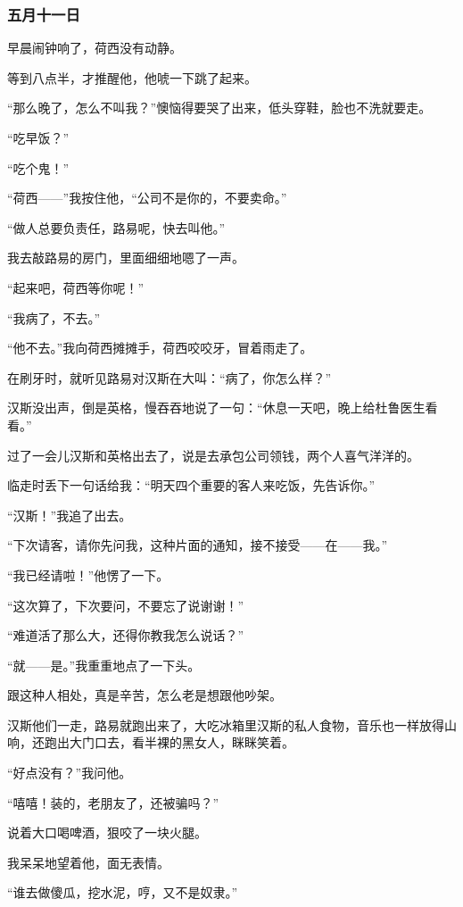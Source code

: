 \subsubsection{五月十一日}
\par 早晨闹钟响了，荷西没有动静。
\par 等到八点半，才推醒他，他唬一下跳了起来。
\par “那么晚了，怎么不叫我？”懊恼得要哭了出来，低头穿鞋，脸也不洗就要走。
\par “吃早饭？”
\par “吃个鬼！”
\par “荷西——”我按住他，“公司不是你的，不要卖命。”
\par “做人总要负责任，路易呢，快去叫他。”
\par 我去敲路易的房门，里面细细地嗯了一声。
\par “起来吧，荷西等你呢！”
\par “我病了，不去。”
\par “他不去。”我向荷西摊摊手，荷西咬咬牙，冒着雨走了。
\par 在刷牙时，就听见路易对汉斯在大叫：“病了，你怎么样？”
\par 汉斯没出声，倒是英格，慢吞吞地说了一句：“休息一天吧，晚上给杜鲁医生看看。”
\par 过了一会儿汉斯和英格出去了，说是去承包公司领钱，两个人喜气洋洋的。
\par 临走时丢下一句话给我：“明天四个重要的客人来吃饭，先告诉你。”
\par “汉斯！”我追了出去。
\par “下次请客，请你先问我，这种片面的通知，接不接受——在——我。”
\par “我已经请啦！”他愣了一下。
\par “这次算了，下次要问，不要忘了说谢谢！”
\par “难道活了那么大，还得你教我怎么说话？”
\par “就——是。”我重重地点了一下头。
\par 跟这种人相处，真是辛苦，怎么老是想跟他吵架。
\par 汉斯他们一走，路易就跑出来了，大吃冰箱里汉斯的私人食物，音乐也一样放得山响，还跑出大门口去，看半裸的黑女人，眯眯笑着。
\par “好点没有？”我问他。
\par “嘻嘻！装的，老朋友了，还被骗吗？”
\par 说着大口喝啤酒，狠咬了一块火腿。
\par 我呆呆地望着他，面无表情。
\par “谁去做傻瓜，挖水泥，哼，又不是奴隶。”
